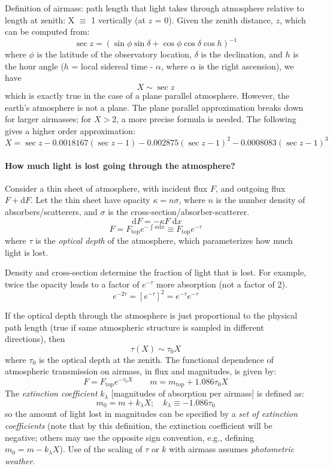 \documentclass[12pt]{article}
\newcommand{\mynotes}[1]{\textcolor{myBlue}{#1}}
\newcommand{\dd}{\;\mathrm{d}}
\begin{document}
Definition of airmass: path length that light takes through atmosphere
relative to length at zenith: X $\equiv$ 1 vertically (at $z$ = 0).
Given the zenith distance, $z$, which can be computed from:
\[
    \sec z = \left( \sin\phi\sin\delta +
    \cos\phi\cos\delta\cos h \right)^{-1}
    \]
where $\phi$ is the latitude of the observatory location, $\delta$ is the
declination, and $h$ is the hour angle ($h$ = local sidereal time - $\alpha$,
where $\alpha$ is the right ascension), we have
\[
    X \sim \sec z
    \]
which is exactly true in the case of a plane parallel atmosphere. However, the
earth's atmosphere is not a plane. The plane parallel approximation breaks down
for larger airmasses; for $X>2$, a more precise formula is needed. The
following gives a higher order approximation:
\[
    X = \sec z - 0.0018167(\sec z-1)
    - 0.002875(\sec z-1)^{2} - 0.0008083(\sec z-1)^{3}
    \]

\paragraph{How much light is lost going through the atmosphere?}
Consider a thin sheet of atmosphere, with incident flux $F$, and outgoing flux
$F + \mathrm{d}F$. Let the thin sheet have opacity $\kappa = n\sigma$, where
$n$ is the number density of absorbers/scatterers, and $\sigma$ is the
cross-section/absorber-scatterer.
\[
    \dd{F} = -\kappa F \dd{x}
     \]
\[
    F = F_{\mathrm{top}} e^{-\int\kappa\mathrm{d}x}
     \equiv F_{\mathrm{top}} e^{-\tau}
     \]
where $\tau$ is the \textit{optical depth} of the atmosphere, which
parameterizes how much light is lost.

\mynotes{Density and cross-section determine the fraction
of light that is lost. For example, twice the opacity leads to
a factor of $e^{-\tau}$ more absorption (not a factor of 2).
\[
    e^{-2\tau} = \left[ e^{-\tau} \right]^{2} = e^{-\tau} e^{-\tau}
    \]
    }

If the optical depth through the atmosphere is just proportional to the
physical path length (true if same atmospheric structure is sampled in
different directions), then
\[
    \tau(X) \sim \tau_{0}X
    \]
where $\tau_{0}$ is the optical depth at the zenith.
The functional dependence of atmospheric transmission on airmass, in flux and
magnitudes, is given by:
\[
     F = F_{\mathrm{top}}e^{-\tau_{0}X} \qquad
     m = m_{\mathrm{top}} + 1.086\tau_{0}X
    \]
The \textit{extinction coefficient} $k_{\lambda}$ [magnitudes of
absorption per airmass] is defined as:
\[
     m_{0} = m + k_{\lambda}X ;\quad
     k_{\lambda} \equiv -1.086\tau_{0}
    \]
so the amount of light lost in magnitudes can be specified by a \emph{set of
extinction coefficients} (note that by this definition, the extinction
coefficient will be negative; others may use the opposite sign convention,
e.g., defining $m_{0} = m - k_{\lambda}X$). Use of the scaling of
$\tau$ or $k$ with airmass assumes \textit{photometric weather}.
\end{document}
